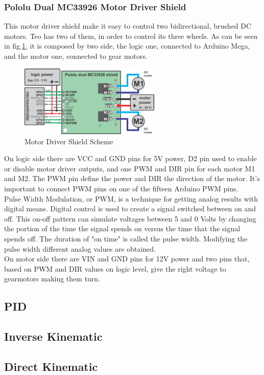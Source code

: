 \subsubsection{Pololu Dual MC33926 Motor Driver Shield}
This motor driver shield make it easy to control two bidirectional, brushed DC motors. Teo has two of them, in order to control its three wheels. As can be seen in fig.\ref{fig:dualmcscheme}, it is composed by two side, the logic one, connected to Arduino Mega, and the motor one, connected to gear motors.
\begin{figure}[h]
	\centering
	\includegraphics[width=0.6\textwidth]{dualmc21}
	\caption{Motor Driver Shield Scheme}
	\label{fig:dualmcscheme}
\end{figure}
On logic side there are VCC and GND pins for 5V power, D2 pin used to enable or disable motor driver outputs, and one PWM and DIR pin for each motor M1 and M2. The PWM pin define the power and DIR the direction of the motor. It's important to connect PWM pins on one of the fifteen Arduino PWM pins.\\
Pulse Width Modulation, or PWM, is a technique for getting analog results with digital means. Digital control is used to create a signal switched between on and off. This on-off pattern can simulate voltages between 5 and 0 Volts by changing the portion of the time the signal spends on versus the time that the signal spends off. The duration of "on time" is called the pulse width. Modifying the pulse width different analog values are obtained.\\
On motor side there are VIN and GND pins for 12V power and two pins that, based on PWM and DIR values on logic level, give the right voltage to gearmotors making them turn.
\subsection{PID}
\subsection{Inverse Kinematic}
\subsection{Direct Kinematic}
